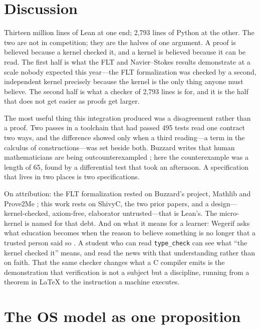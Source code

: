 \documentclass[11pt]{article}
\newcommand{\code}[1]{\texttt{#1}}
\begin{document}
\section{Discussion}
\label{sec:discussion}

Thirteen million lines of Lean at one end; 2{,}793 lines of Python at the
other. The two are not in competition; they are the halves of one argument. A
proof is believed because a kernel checked it, and a kernel is believed
because it can be read. The first half is what the FLT and Navier--Stokes
results demonstrate at a scale nobody expected this year---the FLT
formalization was checked by a second, independent kernel precisely because
the kernel is the only thing anyone must believe. The second half is what a
checker of 2{,}793 lines is for, and it is the half that does not get easier
as proofs get larger.

The most useful thing this integration produced was a disagreement rather than
a proof. Two passes in a toolchain that had passed 495 tests read one contract
two ways, and the difference showed only when a third reading---a term in the
calculus of constructions---was set beside both. Buzzard writes that human
mathematicians are being outcounterexampled \cite{buzzard2026counter}; here
the counterexample was a length of 65, found by a differential test that took
an afternoon. A specification that lives in two places is two specifications.

On attribution: the FLT formalization rested on Buzzard's project, Mathlib and
Prove2Me \cite{thenextweb2026flt}; this work rests on ShivyC, the two prior
papers, and a design---kernel-checked, axiom-free, elaborator untrusted---that
is Lean's. The micro-kernel is named for that debt. And on what it means for a
learner: Wegerif asks what education becomes when the reason to believe
something is no longer that a trusted person said so \cite{wegerif2026}. A
student who can read \code{type\_check} can see what ``the kernel checked it''
means, and read the news with that understanding rather than on faith. That
the same checker changes what a C compiler emits is the demonstration that
verification is not a subject but a discipline, running from a theorem in
\LaTeX{} to the instruction a machine executes.

\appendix

\section{The OS model as one proposition}
\label{sec:appendix}
\end{document}
